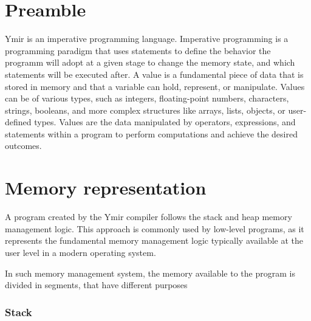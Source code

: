 \section{Preamble}
\label{sec:preamble_type_and_values}

Ymir is an imperative programming language. Imperative programming is a
programming paradigm that uses statements to define the behavior the programm
will adopt at a given stage to change the memory state, and which statements
will be executed after. A value is a fundamental piece of data that is stored in
memory and that a variable can hold, represent, or manipulate. Values can be of
various types, such as integers, floating-point numbers, characters, strings,
booleans, and more complex structures like arrays, lists, objects, or
user-defined types. Values are the data manipulated by operators, expressions,
and statements within a program to perform computations and achieve the desired
outcomes.

\section{Memory representation}
\label{sec:memory_representation}

A program created by the Ymir compiler follows the stack and heap memory
management logic. This approach is commonly used by low-level programs, as it
represents the fundamental memory management logic typically available at the
user level in a modern operating system.

In such memory management system, the memory available to the program is divided in segments, that have different purposes


 \subsubsection*{Stack}
